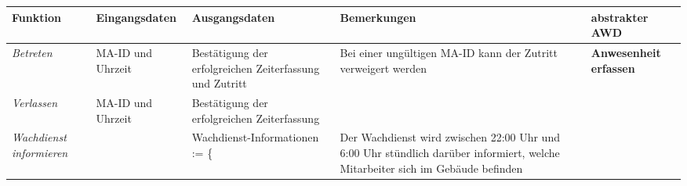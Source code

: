{
\vspace{1cm}
\hspace{-3,5cm}
\footnotesize
\begin{tabular}{|p{3cm}|p{4cm}|p{4cm}|p{4cm}|p{2cm}|}
	\hline
		\textbf{Funktion} &
		\textbf{Eingangsdaten} &
		\textbf{Ausgangsdaten} &
		\textbf{Bemerkungen} &
		\textbf{abstrakter AWD} \\
	\hline \hline
		\textit{Betreten} &
		MA-ID und Uhrzeit &
		Best\"atigung der erfolgreichen Zeiterfassung und Zutritt&
		Bei einer ungültigen MA-ID kann der Zutritt verweigert werden &
		\textbf{Anwesenheit erfassen} \\
	\cline{1-4}
		\textit{Verlassen} &
		MA-ID und Uhrzeit &
		Best\"atigung der erfolgreichen Zeiterfassung  &
		&
		\\
	\cline{1-4}
		\textit{Wachdienst \mbox{informieren}} &
		&
		Wachdienst-Informationen := \newline \{  &
		Der Wachdienst wird zwischen 22:00 Uhr und 6:00 Uhr stündlich darüber informiert, welche Mitarbeiter sich im Gebäude befinden &
		\\
	\hline
\end{tabular}
}

